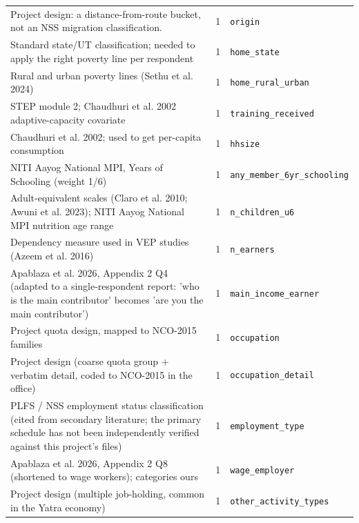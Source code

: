 \documentclass[9pt,a4paper,landscape]{article}
\begin{document}
\begin{longtable}{@{}p{9.5cm}p{1.2cm}p{12.5cm}@{}}
\scriptsize Project design: a distance-from-route bucket, not an NSS migration classification. & \scriptsize 1 & \scriptsize\texttt{origin}\\
\scriptsize Standard state/UT classification; needed to apply the right poverty line per respondent & \scriptsize 1 & \scriptsize\texttt{home\_state}\\
\scriptsize Rural and urban poverty lines (Sethu et al. 2024) & \scriptsize 1 & \scriptsize\texttt{home\_rural\_urban}\\
\scriptsize STEP module 2; Chaudhuri et al. 2002 adaptive-capacity covariate & \scriptsize 1 & \scriptsize\texttt{training\_received}\\
\scriptsize Chaudhuri et al. 2002; used to get per-capita consumption & \scriptsize 1 & \scriptsize\texttt{hhsize}\\
\scriptsize NITI Aayog National MPI, Years of Schooling (weight 1/6) & \scriptsize 1 & \scriptsize\texttt{any\_member\_6yr\_schooling}\\
\scriptsize Adult-equivalent scales (Claro et al. 2010; Awuni et al. 2023); NITI Aayog National MPI nutrition age range & \scriptsize 1 & \scriptsize\texttt{n\_children\_u6}\\
\scriptsize Dependency measure used in VEP studies (Azeem et al. 2016) & \scriptsize 1 & \scriptsize\texttt{n\_earners}\\
\scriptsize Apablaza et al. 2026, Appendix 2 Q4 (adapted to a single-respondent report: 'who is the main contributor' becomes 'are you the main contributor') & \scriptsize 1 & \scriptsize\texttt{main\_income\_earner}\\
\scriptsize Project quota design, mapped to NCO-2015 families & \scriptsize 1 & \scriptsize\texttt{occupation}\\
\scriptsize Project design (coarse quota group + verbatim detail, coded to NCO-2015 in the office) & \scriptsize 1 & \scriptsize\texttt{occupation\_detail}\\
\scriptsize PLFS / NSS employment status classification (cited from secondary literature; the primary schedule has not been independently verified against this project's files) & \scriptsize 1 & \scriptsize\texttt{employment\_type}\\
\scriptsize Apablaza et al. 2026, Appendix 2 Q8 (shortened to wage workers); categories ours & \scriptsize 1 & \scriptsize\texttt{wage\_employer}\\
\scriptsize Project design (multiple job-holding, common in the Yatra economy) & \scriptsize 1 & \scriptsize\texttt{other\_activity\_types}\\

\end{longtable}
\end{document}
